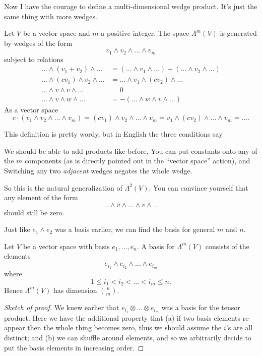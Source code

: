 Now I have the courage to define a multi-dimensional wedge product.
It's just the same thing with more wedges.
\begin{definition}
	Let $V$ be a vector space and $m$ a positive integer.
	The space $\Lambda^m(V)$ is generated by wedges of the form
	\[ v_1 \wedge v_2 \wedge \dots \wedge v_m \]
	subject to relations
	\begin{align*}
		\dots \wedge (v_1+v_2) \wedge \dots
			&= (\dots \wedge v_1 \wedge \dots)
			 + (\dots \wedge v_2 \wedge \dots) \\
		\dots \wedge (cv_1) \wedge v_2 \wedge \dots
			&= \dots \wedge v_1 \wedge (cv_2) \wedge \dots  \\
		\dots \wedge v \wedge v \wedge \dots &= 0 \\
		\dots \wedge v \wedge w \wedge \dots &=
			- (\dots \wedge w \wedge v \wedge \dots)
	\end{align*}
	As a vector space
	\[ c \cdot (v_1 \wedge v_2 \wedge \dots \wedge v_m)
	 = (cv_1) \wedge v_2 \wedge \dots \wedge v_m
	 = v_1 \wedge (cv_2) \wedge \dots \wedge v_m
	 = \dots .
	\]
\end{definition}
This definition is pretty wordy, but in English the three conditions say
\begin{itemize}
	\ii We should be able to add products like before,
	\ii You can put constants onto any of the $m$ components
	(as is directly pointed out in the ``vector space'' action), and
	\ii Switching any two \emph{adjacent} wedges negates the whole wedge.
\end{itemize}
So this is the natural generalization of $\Lambda^2(V)$.
You can convince yourself that any element of the form
\[ \dots \wedge v \wedge \dots \wedge v \wedge \dots \]
should still be zero.

Just like $e_1 \wedge e_2$ was a basis earlier, we can find the basis
for general $m$ and $n$.
\begin{proposition}
	Let $V$ be a vector space with basis $e_1, \dots, e_n$.
	A basis for $\Lambda^m(V)$ consists of the elements
	\[ e_{i_1} \wedge e_{i_2} \wedge \dots \wedge e_{i_m} \]
	where
	\[ 1 \le i_1 < i_2 < \dots < i_m \le n. \]
	Hence $\Lambda^m(V)$ has dimension $\binom nm$.
\end{proposition}
\begin{proof}[Sketch of proof]
	We knew earlier that $e_{i_1} \otimes \dots \otimes e_{i_m}$
	was a basis for the tensor product.
	Here we have the additional property that (a)
	if two basis elements re-appear then the whole thing becomes zero,
	thus we should assume the $i$'s are all distinct;
	and (b) we can shuffle around elements,
	and so we arbitrarily decide to put the basis elements
	in increasing order.
\end{proof}

